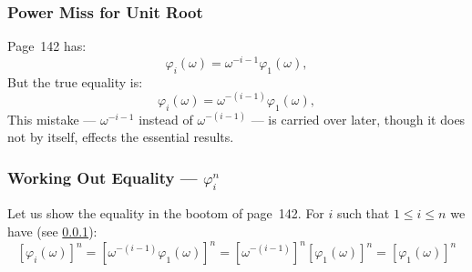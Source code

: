 \subsubsection{Power Miss for Unit Root} \label{sss:powermiss}

Page~142 has:
\begin{equation*}
\varphi_i(\omega) = \omega^{-i-1}\varphi_1(\omega),
\end{equation*}
But the true equality is:
\begin{equation*}
\varphi_i(\omega) = \omega^{-(i-1)}\varphi_1(\omega),
\end{equation*}
This mistake ---
\(\omega^{-i-1}\) instead of
\(\omega^{-(i-1)}\) ---
is carried over later, though it does not by itself,
effects the essential results.

\subsubsection{Working Out Equality --- \ensuremath{\varphi_i^n}}

Let us show the equality in the bootom of page~142.
For $i$ such that \(1\leq i \leq n\) we have (see \ref{sss:powermiss}):
\begin{equation*}
\left[\varphi_{i}(\omega)\right]^n
 = \left[\omega^{-(i-1)}\varphi_1(\omega)\right]^n
 = \left[\omega^{-(i-1)}\right]^n \left[\varphi_1(\omega)\right]^n
 = \left[\varphi_1(\omega)\right]^n
\end{equation*}

\iffalse %
For $i$ such that \(0\leq i < n\) we have (see \ref{sss:powermiss}):
\begin{eqnarray*}
\varphi_{i+1}(\omega)
 & = & \alpha_{i+1}\omega^0 + \cdots \alpha_n\omega^{n-i-1}
       + \alpha_1\omega^{n-i} \cdots + \alpha_{i}\omega^{n-1} \\
 & = & \omega^{n-i}\left(
         \alpha_{i+1}\omega^i + \cdots \alpha_n\omega^{n-1}
         + \alpha_1\omega^{n} \cdots + \alpha_{i}\omega^{i-1}
       \right) \\
 & = & \omega^{n-i}\varphi_1(\omega).
\end{eqnarray*}

Thus,
\begin{equation*}
\left[\varphi_{i+1}(\omega)\right]^n
  = \left[\omega^{n-i}\varphi_1(\omega)\right]^n \\
  = \left[\varphi_1(\omega)\right]^n
\end{equation*}
\fi



